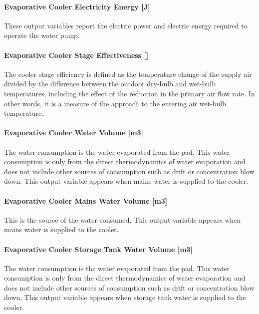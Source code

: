 \paragraph{Evaporative Cooler Electricity Energy {[}J{]}}\label{evaporative-cooler-electric-energy-j-1}

These output variables report the electric power and electric energy required to operate the water pump.

\paragraph{Evaporative Cooler Stage Effectiveness {[]}}\label{evaporative-cooler-stage-effectiveness}

The cooler stage efficiency is defined as the temperature change of the supply air divided by the difference between the outdoor dry-bulb and wet-bulb temperatures, including the effect of the reduction in the primary air flow rate. In other words, it is a measure of the approach to the entering air wet-bulb temperature.

\paragraph{Evaporative Cooler Water Volume {[}m3{]}}\label{evaporative-cooler-water-volume-m3-1}

The water consumption is the water evaporated from the pad. This water consumption is only from the direct thermodynamics of water evaporation and does not include other sources of consumption such as drift or concentration blow down. This output variable appears when mains water is supplied to the cooler.

\paragraph{Evaporative Cooler Mains Water Volume {[}m3{]}}\label{evaporative-cooler-mains-water-volume-m3-1}

This is the source of the water consumed. This output variable appears when mains water is supplied to the cooler.

\paragraph{Evaporative Cooler Storage Tank Water Volume {[}m3{]}}\label{evaporative-cooler-storage-tank-water-volume-m3-1}

The water consumption is the water evaporated from the pad. This water consumption is only from the direct thermodynamics of water evaporation and does not include other sources of consumption such as drift or concentration blow down. This output variable appears when storage tank water is supplied to the cooler.


